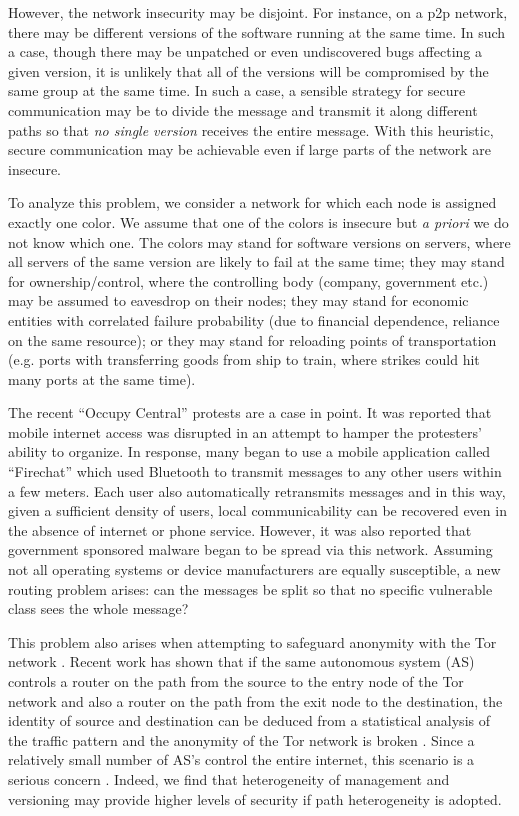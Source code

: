 \documentclass[aps, pre, twocolumn, a4paper, superscriptaddress, floatfix]{revtex4}
\begin{document}
However, the network insecurity may be disjoint.  
For instance, on a p2p network, there may be different versions of the software running at the same time.  
In such a case, though there may be unpatched or even undiscovered bugs affecting a given version, it is unlikely that all of the versions will be compromised by the same group at the same time.
In such a case, a sensible strategy for secure communication may be to divide the message and transmit it along different paths so that \textit{no single version} receives the entire message.
With this heuristic, secure communication may be achievable even if large parts of the network are insecure.

To analyze this problem, we consider a network for which each node is assigned exactly one color.
We assume that one of the colors is insecure but \textit{a priori} we do not know  which one.
The colors may stand for software versions on servers, where all servers of the 
same version are likely to fail at the same time; 
they may stand for ownership/control, where the controlling body (company, government etc.) may be assumed to eavesdrop on their nodes;
they may stand for economic entities with correlated failure probability (due to financial dependence, reliance on the same resource); 
or they may stand for reloading points of transportation (e.g. ports with transferring goods from ship to train, where strikes could hit many ports at the same time). 

The recent ``Occupy Central'' protests are a case in point.
It was reported that mobile internet access was disrupted in an attempt to hamper the protesters' ability to organize.
In response, many began to use a mobile application called ``Firechat'' which used Bluetooth to transmit messages to any other users within a few meters.
Each user also automatically retransmits messages and in this way, given a sufficient density of users, local communicability can be recovered even in the absence of internet or phone service.
However, it was also reported that government sponsored malware began to be spread via this network.
Assuming not all operating systems or device manufacturers are equally susceptible, a new routing problem arises: can the messages be split so that no specific vulnerable class sees the whole message?

This problem also arises when attempting to safeguard anonymity with the Tor network \cite{dingledine-proceedings2004}.  
Recent work has shown that if the same autonomous system (AS) controls a router on the path from the source to the entry node of the Tor network and also a router on the path from the exit node to the destination, the identity of source and destination can be deduced from a statistical analysis of the traffic pattern and the anonymity of the Tor network is broken \cite{murdoch-proceedings2007}.
Since a relatively small number of AS's control the entire internet, this scenario is a serious concern \cite{edman-proceedings2009}.
Indeed, we find that heterogeneity of management and versioning may provide higher levels of security if path heterogeneity is adopted.
\end{document}
